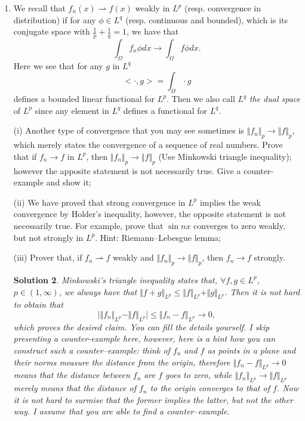\documentclass[6pt]{article}
\newtheorem{solution}{Solution}
\numberwithin{equation}{section}
\begin{document}
\begin{enumerate}
\begin{solution}
(ii).  Applying Riemann--Lebesgue lemma gives the desired limit.  I already presented partial approach in class and I assume/need that you know how to prove this lemma in detail.  One student, if you all remember, mentioned that you learnt this in Calculus.  It is possible but I still doubt it as the $L^2$-norm was not introduced by then.  Wish me wrong.
\end{solution}

\item  We recall that $f_n(x) \rightharpoonup f(x)$ weakly in $L^p$ (resp. convergence in distribution) if for any $\phi\in L^q$ (resp. continuous and bounded), which is its conjugate space with $\frac{1}{p}+\frac{1}{q}=1$, we have that
\[\int_\Omega f_n\phi dx\rightarrow \int_\Omega f\phi dx.\]
Here we see that for any $g$ in $L^q$
\[<\cdot, g>=\int_\Omega \cdot g\]
defines a bounded linear functional for $L^p$.  Then we also call $L^q$ \emph{the dual space} of $L^p$ since any element in $L^q$ defines a functional for $L^q$.

(i)  Another type of convergence that you may see sometimes is $\Vert f_n \Vert_p\rightarrow \Vert f\Vert_p$, which merely states the convergence of a sequence of real numbers.  Prove that if $f_n \rightarrow f$ in $L^p$, then $\Vert f_n \Vert_p\rightarrow \Vert f\Vert_p$ (Use Minkowski triangle inequality); however the apposite statement is not necessarily true.  Give a counter-example and show it;

(ii) We have proved that strong convergence in $L^p$ implies the weak convergence by Holder's inequality, however, the opposite statement is not necessarily true.  For example, prove that $\sin nx$ converges to zero weakly, but not strongly in $L^p$.  Hint: Riemann--Lebesgue lemma;

(iii) Prover that, if $f_n \rightharpoonup f$ weakly and $\Vert f_n \Vert_p\rightarrow \Vert f\Vert_p$, then $f_n\rightarrow f$ strongly.
\begin{solution}
Minkowski's triangle inequality states that, $\forall f,g\in L^p$, $p\in(1,\infty)$, we always have that $\Vert f+g\Vert_{L^p}\leq \Vert f\Vert_{L^p}+\Vert g\Vert_{L^p}$.  Then it is not hard to obtain that
\[\big| \Vert f_n\Vert_{L^p}-\Vert f\Vert_{L^p} \big|\leq \Vert f_n-f\Vert_{L^p}\rightarrow 0,\]
which proves the desired claim.  You can fill the details yourself. I skip presenting a counter-example here, however, here is a hint how you can construct such a counter--example:  think of $f_n$ and $f$ as points in a plane and their norms measure the distance from the origin, therefore $\Vert f_n-f\Vert_{L^p}\rightarrow 0$ means that the distance between $f_n$ are $f$ goes to zero, while $\Vert f_n\Vert_{L^p}\rightarrow \Vert f\Vert_{L^p}$ merely means that the distance of $f_n$ to the origin converges to that of $f$.  Now it is not hard to surmise that the former implies the latter, but not the other way.  I assume that you are able to find a counter--example.


\end{solution}
\end{enumerate}
\end{document}
